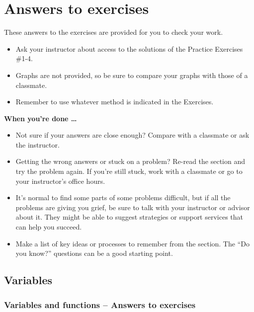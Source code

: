\chapter{Answers to exercises}

These answers to the exercises are provided for you to check your work.

\begin{itemize}
\item Ask your instructor about access to the solutions of the Practice Exercises \#1-4.
\item Graphs are not provided, so be sure to compare your graphs with those of a classmate.
\item Remember to use whatever method is indicated in the Exercises.
\end{itemize}

\noindent \textbf{When you're done \ldots}

\begin{itemize}
\item Not sure if your answers are close enough? Compare with a classmate or ask the instructor.  
\item Getting the wrong answers or stuck on a problem?  Re-read the section and try the problem again.   If you're still stuck, work with a classmate or go to your instructor's office hours.
\item It's normal to find some parts of some problems difficult, but if all the problems are giving you grief, be sure to talk with your instructor or advisor about it.  They might be able to suggest strategies or support services that can help you succeed.
\item Make a list of key ideas or processes to remember from the section.  The ``Do you know?'' questions can be a good starting point.
\end{itemize}

\newpage  %

\section{Variables} %

\bigskip

\subsection{Variables and functions -- Answers to exercises} %

